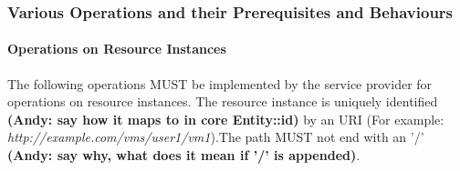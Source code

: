 \documentclass[10pt,a4paper]{article}
\begin{document}
\subsubsection{Various Operations and their Prerequisites and Behaviours}

\paragraph{Operations on Resource Instances}
The following operations MUST be implemented by the service provider
for operations on resource instances. The resource instance is
uniquely identified \textbf{(Andy: say how it maps to in core Entity::id)} 
by an URI (For example:
\emph{http://example.com/vms/user1/vm1}).The path MUST not end
with an '/' \textbf{(Andy: say why, what does it mean if '/' is appended)}.
\end{document}
